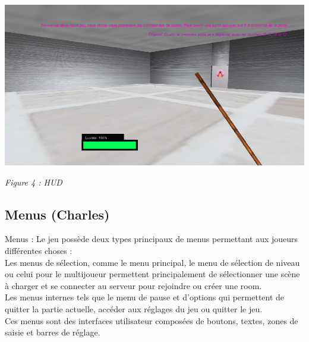 \documentclass[a4paper , 12pt]{article}
\begin{document}
\begin{centering}

\includegraphics[scale = 0.65]{hud.png}


\quad

\textit{Figure 4 : HUD}

\end{centering}

	\quad

	\newpage


	\subsection{Menus (Charles)}

\quad

Menus : Le jeu possède deux types principaux de menus permettant aux joueurs différentes choses :\\

Les menus de sélection, comme le menu principal, le menu de sélection de niveau ou celui pour le multijoueur permettent principalement de sélectionner une scène à charger et se connecter au serveur pour rejoindre ou créer une room. \\

Les menus internes tels que le menu de pause et d’options qui permettent de quitter la partie actuelle, accéder aux réglages du jeu ou quitter le jeu.\\

Ces menus sont des interfaces utilisateur composées de boutons, textes, zones de saisie et barres de réglage.

\quad
\end{document}
